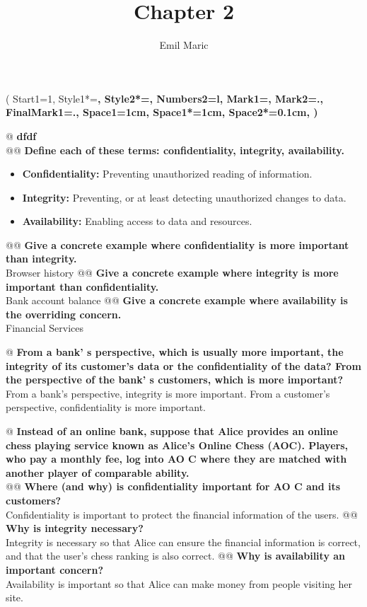 \documentclass{article}
\begin{document}
\title{Chapter 2}
\author{Emil Maric}
\maketitle

\begin{easylist}
 	\ListProperties(
 		Start1=1,
	  	Style1*=\bfseries,
	  	Style2*=\bfseries,
	  	Numbers2=l,
	  	Mark1={},
	  	Mark2={.},
	  	FinalMark1={.},
	  	Space1=1cm,
	  	Space1*=1cm,
	  	Space2*=0.1cm,
	)
  
 	@  \textbf{dfdf}\\
 	@@ \textbf{Define each of these terms: confidentiality, integrity, availability.}
 		\begin{itemize}
 			\item \textbf{Confidentiality:} Preventing unauthorized reading of information.
 			\item \textbf{Integrity:} Preventing, or at least detecting unauthorized changes to data.
 			\item \textbf{Availability:} Enabling access to data and resources.
 		\end{itemize}
 	@@ \textbf{Give a concrete example where confidentiality is more important than integrity.}\\
 		Browser history
 	@@ \textbf{Give a concrete example where integrity is more important than confidentiality.}\\
 		Bank account balance
 	@@ \textbf{Give a concrete example where availability is the overriding concern.}\\
 		Financial Services

 	@ \textbf{From a bank' s perspective, which is usually more important, the integrity of its customer's data or the confidentiality of the data? From the perspective of the bank' s customers, which is more important?}\\
 		From a bank's perspective, integrity is more important. From a customer's perspective, confidentiality is more important.%
 	
 	@ \textbf{Instead of an online bank, suppose that Alice provides an online chess playing service known as Alice's Online Chess (AOC). Players, who pay a monthly fee, log into AO C where they are matched with another player of comparable ability.}\\
 	@@ \textbf{Where (and why) is confidentiality important for AO C and its
customers?}\\
 		Confidentiality is important to protect the financial information of the users.
 	@@ \textbf{Why is integrity necessary?}\\
 		Integrity is necessary so that Alice can ensure the financial information is correct, and that the user's chess ranking is also correct.
 	@@ \textbf{Why is availability an important concern?}\\
 		Availability is important so that Alice can make money from people visiting her site.
 	

\end{easylist}
\end{document}
